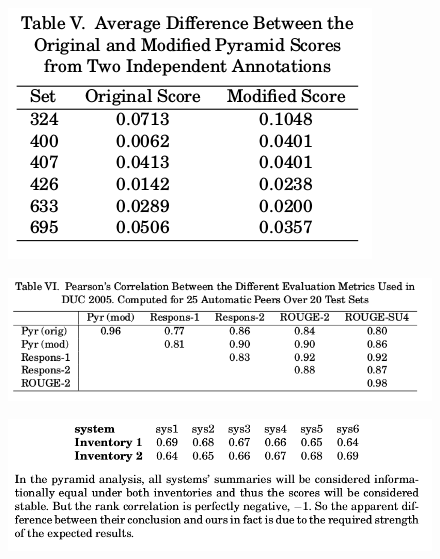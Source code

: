 \documentclass[xcolor={table}]{beamer}
\begin{document}
\begin{frame}[t]{\cite{nenkova2007pyramid}}
      \begin{figure}[h]
          \centering
      \includegraphics[scale=.35]{images/table5-nenkova07.png} \\
  \end{figure}
\end{frame}

\begin{frame}[t]{\cite{nenkova2007pyramid}}
      \begin{figure}[h]
          \centering
      \includegraphics[scale=.35]{images/table6-nenkova07.png} \\
  \end{figure}
\end{frame}

\begin{frame}[t]{\cite{nenkova2007pyramid}}
      \begin{figure}[h]
          \centering
      \includegraphics[scale=.35]{images/inv-nenkova07.png} \\
  \end{figure}
\end{frame}
\end{document}

